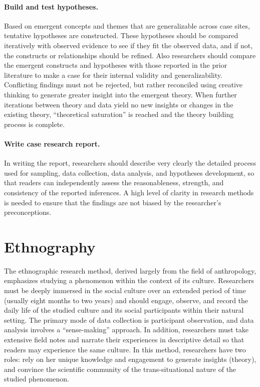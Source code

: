 \paragraph{Build and test hypotheses.} Based on emergent concepts and themes that are generalizable across case sites, tentative hypotheses are constructed. These hypotheses should be compared iteratively with observed evidence to see if they fit the observed data, and if not, the constructs or relationships should be refined. Also researchers should compare the emergent constructs and hypotheses with those reported in the prior literature to make a case for their internal validity and generalizability. Conflicting findings must not be rejected, but rather reconciled using creative thinking to generate greater insight into the emergent theory. When further iterations between theory and data yield no new insights or changes in the existing theory, ``theoretical saturation'' is reached and the theory building process is complete.

\paragraph{Write case research report.} In writing the report, researchers should describe very clearly the detailed process used for sampling, data collection, data analysis, and hypotheses development, so that readers can independently assess the reasonableness, strength, and consistency of the reported inferences. A high level of clarity in research methods is needed to ensure that the findings are not biased by the researcher's preconceptions.

\section{Ethnography}

The ethnographic research method, derived largely from the field of anthropology, emphasizes studying a phenomenon within the context of its culture. Researchers must be deeply immersed in the social culture over an extended period of time (usually eight months to two years) and should engage, observe, and record the daily life of the studied culture and its social participants within their natural setting. The primary mode of data collection is participant observation, and data analysis involves a ``sense-making'' approach. In addition, researchers must take extensive field notes and narrate their experiences in descriptive detail so that readers may experience the same culture. In this method, researchers have two roles: rely on her unique knowledge and engagement to generate insights (theory), and convince the scientific community of the trans-situational nature of the studied phenomenon.

